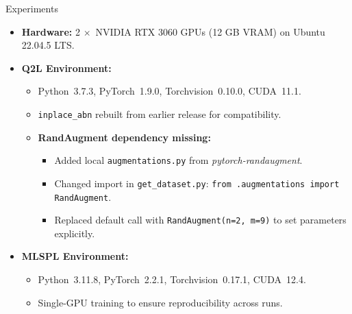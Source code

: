 \begin{frame}{Experiments}
  \begin{itemize}
  \item \textbf{Hardware:} 2$\,\times$ NVIDIA RTX 3060 GPUs (12 GB VRAM) on Ubuntu 22.04.5 LTS.

  \item \textbf{Q2L Environment:}
    \begin{itemize}
      \item Python~3.7.3, PyTorch~1.9.0, Torchvision~0.10.0, CUDA~11.1.
      \item \texttt{inplace\_abn} rebuilt from earlier release for compatibility.
      \item \textbf{RandAugment dependency missing:}
        \begin{itemize}
          \item Added local \texttt{augmentations.py} from \textit{pytorch-randaugment}.
          \item Changed import in \texttt{get\_dataset.py}: \texttt{from .augmentations import RandAugment}.
          \item Replaced default call with \texttt{RandAugment(n=2, m=9)} to set parameters explicitly.
        \end{itemize}
    \end{itemize}

  \item \textbf{MLSPL Environment:}
    \begin{itemize}
      \item Python~3.11.8, PyTorch~2.2.1, Torchvision~0.17.1, CUDA~12.4.
      \item Single-GPU training to ensure reproducibility across runs.
    \end{itemize}
\end{itemize}
\end{frame}

